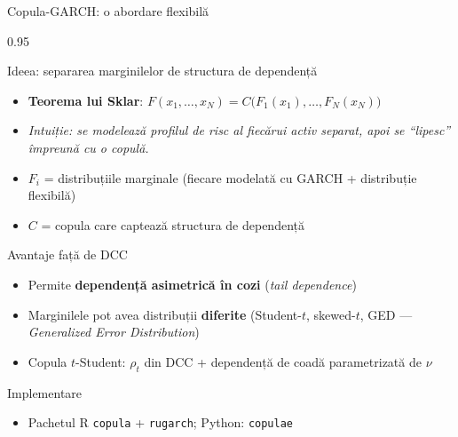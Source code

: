 \documentclass[9pt, aspectratio=169, t]{beamer}
\begin{document}
\begin{frame}{Copula-GARCH: o abordare flexibilă}
    \begin{cminipage}{0.95\textwidth}
    {\footnotesize
    \begin{block}{Ideea: separarea marginilelor de structura de dependență}
        \begin{itemize}\setlength{\itemsep}{0pt}
            \item \textbf{Teorema lui Sklar}: $F(x_1, \ldots, x_N) = C\big(F_1(x_1), \ldots, F_N(x_N)\big)$
            \item \textit{Intuiție: se modelează profilul de risc al fiecărui activ separat, apoi se ``lipesc'' împreună cu o copulă.}
            \item $F_i$ = distribuțiile marginale (fiecare modelată cu GARCH + distribuție flexibilă)
            \item $C$ = copula care captează structura de dependență
        \end{itemize}
    \end{block}
    \begin{block}{Avantaje față de DCC}
        \begin{itemize}\setlength{\itemsep}{0pt}
            \item Permite \textbf{dependență asimetrică în cozi} (\textit{tail dependence})
            \item Marginilele pot avea distribuții \textbf{diferite} (Student-$t$, skewed-$t$, GED --- \textit{Generalized Error Distribution})
            \item Copula $t$-Student: $\rho_t$ din DCC + dependență de coadă parametrizată de $\nu$
        \end{itemize}
    \end{block}
    \begin{alertblock}{Implementare}
        \begin{itemize}\setlength{\itemsep}{0pt}
            \item Pachetul R \texttt{copula} + \texttt{rugarch}; Python: \texttt{copulae}
        \end{itemize}
    \end{alertblock}
    }
    \end{cminipage}
\end{frame}
\end{document}
